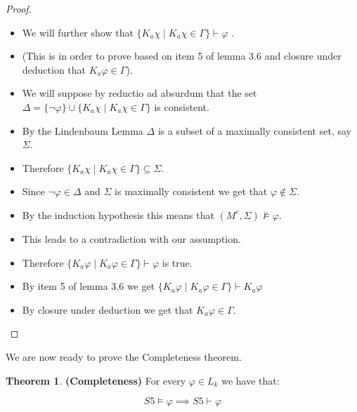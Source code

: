 \documentclass[12pt]{article}
\numberwithin{equation}{section}
\theoremstyle{definition}
\newtheorem{thm}{Theorem}[section]
\theoremstyle{definition}
\theoremstyle{remark}
\begin{document}
\begin{proof}
\begin{enumerate}
\begin{itemize}
    \item We will further show that $ \{ K_a\chi \mid K_a\chi \in \Gamma \} \vdash  \varphi$ .
    \item (This is in order to prove based on item 5 of lemma 3.6 and closure under deduction that $K_a\varphi \in \Gamma$).
    
    \item We will suppose by reductio ad absurdum that the set $\Delta = \{ \neg \varphi \} \cup \{ K_a \chi \mid K_a\chi \in \Gamma \}$ is consistent.
    \item By the Lindenbaum Lemma $\Delta$ is a subset of a maximally consistent set, say $\Sigma$. \item Therefore $\{ K_a \chi \mid K_a\chi \in \Gamma \} \subseteq \Sigma$.
    
    
    \item Since $\neg \varphi \in \Delta$ and $\Sigma$ is maximally consistent we get that $\varphi \notin \Sigma$.
    \item By the induction hypothesis this means that $(M^c, \Sigma) \not\models \varphi$.
    \item This leads to a contradiction with our assumption.
    \item Therefore $ \{ K_a\varphi \mid K_a\varphi \in \Gamma \} \vdash  \varphi$ is true.
    \item By item 5 of lemma 3.6 we get $\{ K_a\varphi \mid K_a\varphi \in \Gamma \} \vdash  K_a \varphi$
    \item By closure under deduction we get that $K_a\varphi \in \Gamma$.
    \end{itemize}
\end{enumerate}
\end{proof}



We are now ready to prove the Completeness theorem.

\begin{thm}

\textbf{(Completeness)}
For every $\varphi \in L_k$ we have that:

$$
S5 \models \varphi \implies S5 \vdash \varphi
$$
\end{thm}
\end{document}
